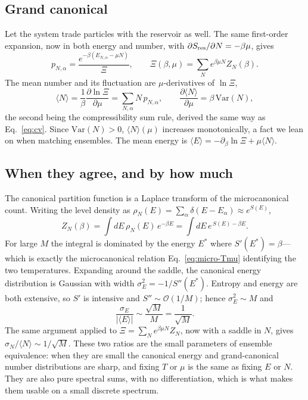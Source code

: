 \documentclass[twocolumn,10pt]{article}
\newcommand{\avg}[1]{\langle #1 \rangle}
\newcommand{\Var}{\mathrm{Var}}
\begin{document}
\subsection{Grand canonical}
Let the system trade particles with the reservoir as well. The same first-order
expansion, now in both energy and number, with $\partial S_{\rm res}/\partial
N=-\beta\mu$, gives
\begin{equation}
p_{N,\alpha}=\frac{e^{-\beta(E_{N,\alpha}-\mu N)}}{\Xi},\qquad
\Xi(\beta,\mu)=\sum_N e^{\beta\mu N}Z_N(\beta).
\end{equation}
The mean number and its fluctuation are $\mu$-derivatives of $\ln\Xi$,
\begin{equation}
\avg N=\frac1\beta\frac{\partial\ln\Xi}{\partial\mu}=\sum_{N,\alpha}N\,p_{N,\alpha},
\qquad
\frac{\partial\avg N}{\partial\mu}=\beta\,\Var(N),
\label{eq:dndmu}
\end{equation}
the second being the compressibility sum rule, derived the same way as
Eq.~\eqref{eq:cv}. Since $\Var(N)>0$, $\avg N(\mu)$ increases monotonically, a
fact we lean on when matching ensembles. The mean energy is
$\avg E=-\partial_\beta\ln\Xi+\mu\avg N$.

\subsection{When they agree, and by how much}
The canonical partition function is a Laplace transform of the microcanonical
count. Writing the level density as $\rho_N(E)=\sum_\alpha\delta(E-E_\alpha)\approx
e^{S(E)}$,
\begin{equation}
Z_N(\beta)=\int\! dE\,\rho_N(E)\,e^{-\beta E}
=\int\! dE\,e^{\,S(E)-\beta E}.
\end{equation}
For large $M$ the integral is dominated by the energy $E^\ast$ where
$S'(E^\ast)=\beta$---which is exactly the microcanonical relation
Eq.~\eqref{eq:micro-Tmu} identifying the two temperatures. Expanding around the
saddle, the canonical energy distribution is Gaussian with width
$\sigma_E^2=-1/S''(E^\ast)$. Entropy and energy are both extensive, so $S'$ is
intensive and $S''\sim\mathcal O(1/M)$; hence $\sigma_E^2\sim M$ and
\begin{equation}
\frac{\sigma_E}{|\avg E|}\sim\frac{\sqrt M}{M}=\frac1{\sqrt M}.
\label{eq:relE}
\end{equation}
The same argument applied to $\Xi=\sum_N e^{\beta\mu N}Z_N$, now with a saddle in
$N$, gives $\sigma_N/\avg N\sim 1/\sqrt M$. These two ratios are the small
parameters of ensemble equivalence: when they are small the canonical energy and
grand-canonical number distributions are sharp, and fixing $T$ or $\mu$ is the
same as fixing $E$ or $N$. They are also pure spectral sums, with no
differentiation, which is what makes them usable on a small discrete spectrum.
\end{document}
